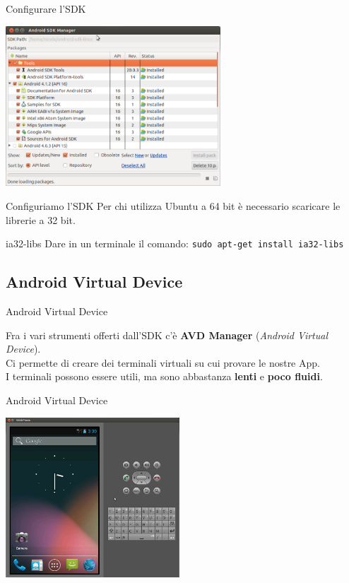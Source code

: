 \documentclass[xcolor=svgnames,11pt]{beamer}
\begin{document}
\begin{frame}{Configurare l'SDK}
\begin{center}
\includegraphics[height=6cm]{manage.png}
\end{center}
\end{frame}

\begin{frame}{Configuriamo l'SDK}
Per chi utilizza Ubuntu a 64 bit \`e necessario scaricare le librerie a 32 bit.
\pause
\medskip
\begin{block}{ia32-libs}
Dare in un terminale il comando: \texttt{sudo apt-get install ia32-libs}
\end{block}
\end{frame}

\subsection{Android Virtual Device}
\begin{frame}{Android Virtual Device}

	Fra i vari strumenti offerti dall'SDK c'\`e \textbf{AVD Manager} (\emph{Android Virtual Device}).\\
	\pause
	\medskip
	Ci permette di creare dei terminali virtuali su cui provare le nostre App.\\
	\pause
	\medskip
	I terminali possono essere utili, ma sono abbastanza \textbf{lenti} e \textbf{poco fluidi}.

\end{frame}
\begin{frame}{Android Virtual Device}

\begin{center}
\includegraphics[height=6cm]{avd.png}
\end{center}
\end{frame}
\end{document}
